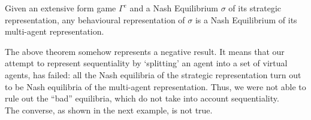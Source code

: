 \begin{theorem}
Given an extensive form game $\Gamma^e$ and a Nash Equilibrium $\sigma$ of its strategic representation, any behavioural representation of $\sigma$ is a Nash Equilibrium of its multi-agent representation.
\end{theorem}

The above theorem somehow represents a negative result.  It means that our attempt to represent sequentiality by `splitting' an agent into a set of virtual agents, has failed: all the Nash equilibria of the strategic representation turn out to be Nash equilibria of the multi-agent representation. Thus, we were not able to rule out the ``bad'' equilibria, which do not take into account sequentiality.\\
The converse, as shown in the next example, is not true.

